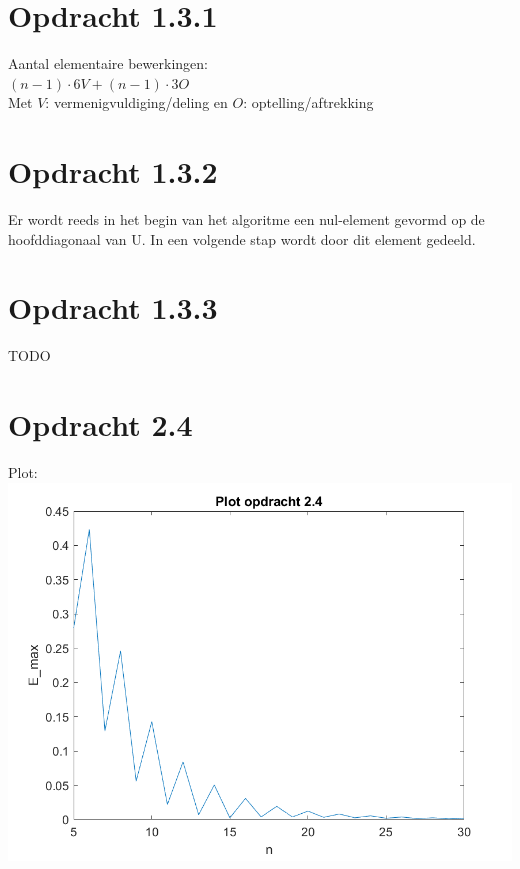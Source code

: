 \documentclass[a4paper]{article}
\begin{document}
\section*{Opdracht 1.3.1}
Aantal elementaire bewerkingen:
\\$(n-1) \cdot 6V + (n-1) \cdot 3O$
\\Met $V$: vermenigvuldiging/deling en $O$: optelling/aftrekking
%
%
%
%
%
%
\section*{Opdracht 1.3.2}
Er wordt reeds in het begin van het algoritme een nul-element gevormd op de hoofddiagonaal van U. In een volgende stap wordt door dit element gedeeld.

%
%
%
%
%
\section*{Opdracht 1.3.3}
TODO
%
%
%
%
%
%
\section*{Opdracht 2.4}
Plot:
\\{}
\includegraphics[scale = 0.8]{plot2_4}
%
%
%
%
%
%
\end{document}
